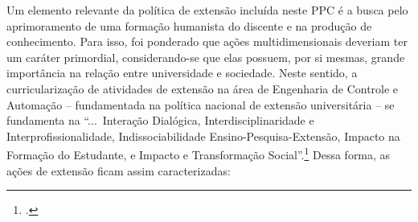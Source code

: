 \documentclass[
	12pt,				%
	openright,			%
	oneside,			%
	a4paper,			%
	english,			%
	brazil				%
	]{abntex2}
\begin{document}
Um elemento relevante da política de extensão incluída neste PPC é a busca pelo aprimoramento de uma formação humanista do discente e na produção de conhecimento. Para isso, foi ponderado que ações multidimensionais deveriam ter um caráter primordial, considerando-se que elas possuem, por si mesmas, grande importância na relação entre universidade e sociedade. Neste sentido, a curricularização de atividades de extensão na área de Engenharia de Controle e Automação -- fundamentada na política nacional de extensão universitária -- se fundamenta na ``...~Interação Dialógica, Interdisciplinaridade e Interprofissionalidade, Indissociabilidade Ensino-Pesquisa-Extensão, Impacto na Formação do Estudante, e Impacto e Transformação Social''.\footcites[][p.~29]{forproex2012}[Ver também a própria politica das engenharias da UFOP, conforme a resolução CEPE/UFOP 7609/2018, em][]{politica-eng-2022-ufop} Dessa forma, as ações de extensão ficam assim caracterizadas:
\end{document}
